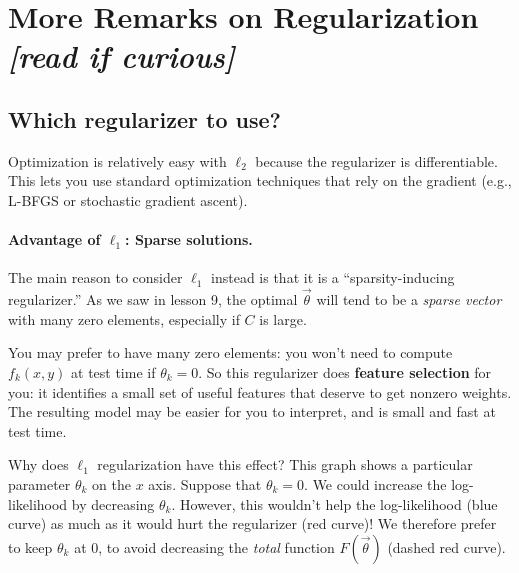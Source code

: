 \documentclass[11pt]{article}
\newcommand{\vtheta}{\vec{\theta}}
\begin{document}
\section{More Remarks on Regularization {\em [read if curious]}}

\subsection{Which regularizer to use?}

%

Optimization is relatively easy with $\ell_2$ because the regularizer
is differentiable.  This lets you use standard optimization techniques
that rely on the gradient (e.g., L-BFGS or stochastic gradient ascent).

\paragraph{Advantage of $\ell_1$:  Sparse solutions.}  The main reason to consider $\ell_1$ instead is that it is a ``sparsity-inducing regularizer.''  As we saw in lesson 9, the optimal $\vtheta$ will tend to be a {\em sparse vector} with many zero elements, especially if $C$ is large.

You may prefer to have many zero elements: you won't need to compute $f_k(x,y)$ at test time if $\theta_k=0$.  So this regularizer does {\bf feature selection} for you: it identifies a small set of useful features that deserve to get nonzero weights.  The resulting model may be easier for you to interpret, and is small and fast at test time.

Why does $\ell_1$ regularization have this effect?  This graph shows a particular parameter $\theta_k$ on the $x$ axis.  Suppose that $\theta_k=0$.  We could increase the log-likelihood by decreasing $\theta_k$.  However, this wouldn't help the log-likelihood (blue curve) as much as it would hurt the regularizer (red curve)!  We therefore prefer to keep $\theta_k$ at 0, to avoid decreasing the {\em total} function $F(\vtheta)$ (dashed red curve).
\end{document}
